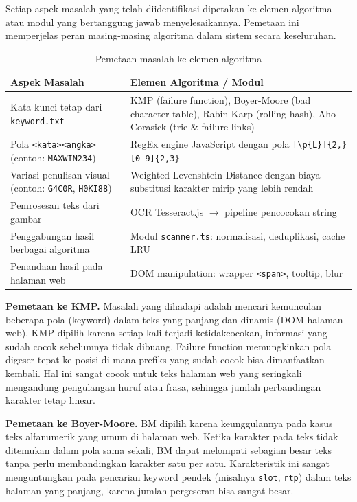 Setiap aspek masalah yang telah diidentifikasi dipetakan ke elemen algoritma
atau modul yang bertanggung jawab menyelesaikannya. Pemetaan ini
memperjelas peran masing-masing algoritma dalam sistem secara keseluruhan.

\begin{table}[H]
\centering
\caption{Pemetaan masalah ke elemen algoritma}
\label{tab:pemetaan-algoritma}
\begin{tabular}{|p{4.5cm}|p{8.5cm}|}
\hline
\textbf{Aspek Masalah} & \textbf{Elemen Algoritma / Modul} \\
\hline
Kata kunci tetap dari \texttt{keyword.txt} &
KMP (failure function), Boyer-Moore (bad character table), Rabin-Karp
(rolling hash), Aho-Corasick (trie \& failure links) \\
\hline
Pola \texttt{<kata><angka>} (contoh: \texttt{MAXWIN234}) &
RegEx engine JavaScript dengan pola \texttt{[\textbackslash{}p\{L\}]\{2,\}[0-9]\{2,3\}} \\
\hline
Variasi penulisan visual (contoh: \texttt{G4C0R}, \texttt{H0KI88}) &
Weighted Levenshtein Distance dengan biaya substitusi karakter mirip
yang lebih rendah \\
\hline
Pemrosesan teks dari gambar & OCR Tesseract.js \(\rightarrow\) pipeline
pencocokan string \\
\hline
Penggabungan hasil berbagai algoritma & Modul \texttt{scanner.ts}:
normalisasi, deduplikasi, cache LRU \\
\hline
Penandaan hasil pada halaman web & DOM manipulation: wrapper
\texttt{<span>}, tooltip, blur \\
\hline
\end{tabular}
\end{table}

\textbf{Pemetaan ke KMP.}
Masalah yang dihadapi adalah mencari kemunculan beberapa pola (keyword) dalam
teks yang panjang dan dinamis (DOM halaman web). KMP dipilih karena setiap
kali terjadi ketidakcocokan, informasi yang sudah cocok sebelumnya tidak
dibuang. Failure function memungkinkan pola digeser tepat ke posisi di mana
prefiks yang sudah cocok bisa dimanfaatkan kembali. Hal ini sangat cocok
untuk teks halaman web yang seringkali mengandung pengulangan huruf atau
frasa, sehingga jumlah perbandingan karakter tetap linear.

\textbf{Pemetaan ke Boyer-Moore.}
BM dipilih karena keunggulannya pada kasus teks alfanumerik yang umum di
halaman web. Ketika karakter pada teks tidak ditemukan dalam pola sama
sekali, BM dapat melompati sebagian besar teks tanpa perlu membandingkan
karakter satu per satu. Karakteristik ini sangat menguntungkan pada
pencarian keyword pendek (misalnya \texttt{slot}, \texttt{rtp}) dalam teks
halaman yang panjang, karena jumlah pergeseran bisa sangat besar.

